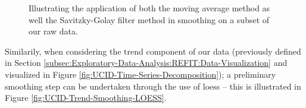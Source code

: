 \begin{adjustwidth}{-1.65cm}{-0.0cm}
\begin{enumerate}[label=Step 3.\arabic*:, leftmargin=*]
    \begin{figure}[hbt!]
        \begin{adjustwidth}{-3.0cm}{-3.0cm}%
                \myfloatalign
                 \quad
                 \quad
                \caption{Illustrating the application of both the moving average method as well the Savitzky-Golay filter method in smoothing on a subset of our raw data.}
        \end{adjustwidth}
    \end{figure}
    
    \noindent \newline Similarily, when considering the trend component of our data (previously defined in Section \ref{subsec:Exploratory-Data-Analysis:REFIT:Data-Visualization} and visualized in Figure \ref{fig:UCID-Time-Series-Decomposition}); a preliminary smoothing step can be undertaken through the use of \gls{loess} -- this is illustrated in Figure \ref{fig:UCID-Trend-Smoothing-LOESS}.
    

\end{enumerate}
\end{adjustwidth}

